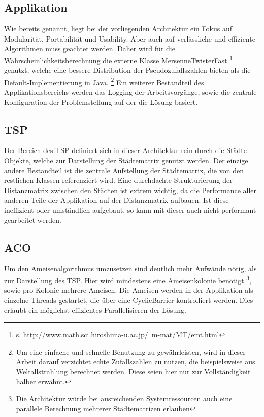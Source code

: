 {	\subsection{Applikation}
	Wie bereits genannt, liegt bei der vorliegenden Architektur ein Fokus auf Modularität, Portabilität und Usability. Aber auch auf verlässliche und effiziente Algorithmen muss geachtet werden. Daher wird für die Wahrscheinlichkeitsberechnung die externe Klasse MersenneTwisterFast \footnote{s. http://www.math.sci.hiroshima-u.ac.jp/~m-mat/MT/emt.html} genutzt, welche eine bessere Distribution der Pseudozufallszahlen bieten als die Default-Implementierung in Java.
	\footnote{Um eine einfache und schnelle Benutzung zu gewährleisten, wird in dieser Arbeit darauf verzichtet echte Zufallszahlen zu nutzen, die beispielsweise aus Weltallstrahlung berechnet werden. Diese seien hier nur zur Vollständigkeit halber erwähnt.}
	Ein weiterer Bestandteil des Applikationsbereichs werden das Logging der Arbeitsvorgänge, sowie die zentrale Konfiguration der Problemstellung auf der die Lösung basiert.
	
	\subsection{TSP}
	Der Bereich des TSP definiert sich in dieser Architektur rein durch die Städte-Objekte, welche zur Darstellung der Städtematrix genutzt werden. Der einzige andere Bestandteil ist die zentrale Aufstellung der Städtematrix, die von den restlichen Klassen referenziert wird. Eine durchdachte Strukturierung der Distanzmatrix zwischen den Städten ist extrem wichtig, da die Performance aller anderen Teile der Applikation auf der Distanzmatrix aufbauen. Ist diese ineffizient oder umständlich aufgebaut, so kann mit dieser auch nicht performant gearbeitet werden.
	
	\subsection{ACO}
	Um den Ameisenalgorithmus umzusetzen sind deutlich mehr Aufwände nötig, als zur Darstellung des TSP. Hier wird mindestens eine Ameisenkolonie benötigt \footnote{Die Architektur würde bei ausreichenden Systemressourcen auch eine parallele Berechnung mehrerer Städtematrizen erlauben}, sowie pro Kolonie mehrere Ameisen. Die Ameisen werden in der Applikation als einzelne Threads gestartet, die über eine CyclicBarrier kontrolliert werden. Dies erlaubt ein möglichst effizientes Parallelisieren der Lösung.
	
}
